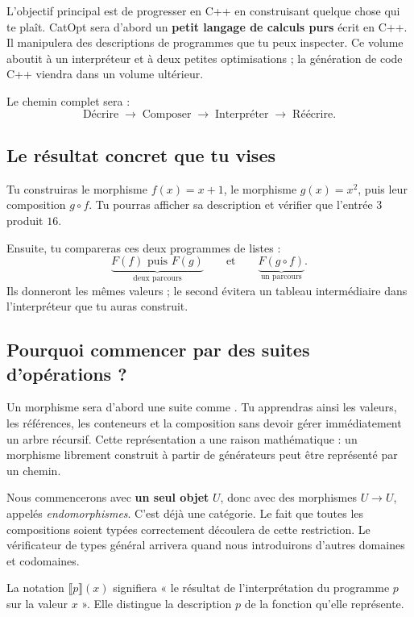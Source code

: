 \documentclass[11pt,a4paper]{article}
\newcommand{\code}[1]{\texttt{\detokenize{#1}}}
\newcommand{\sem}[1]{\llbracket #1\rrbracket}
\begin{document}
L'objectif principal est de progresser en C++ en construisant quelque chose
qui te plaît. CatOpt sera d'abord un \textbf{petit langage de calculs purs}
écrit en C++. Il manipulera des descriptions de programmes que tu peux
inspecter. Ce volume aboutit à un interpréteur et à deux petites optimisations ;
la génération de code C++ viendra dans un volume ultérieur.

Le chemin complet sera :
\[
\boxed{\text{Décrire}}\;\longrightarrow\;
\boxed{\text{Composer}}\;\longrightarrow\;
\boxed{\text{Interpréter}}\;\longrightarrow\;
\boxed{\text{Réécrire}}.
\]

\subsection{Le résultat concret que tu vises}
Tu construiras le morphisme \(f(x)=x+1\), le morphisme \(g(x)=x^2\), puis
leur composition \(g\circ f\). Tu pourras afficher sa description et
vérifier que l'entrée \(3\) produit \(16\).

Ensuite, tu compareras ces deux programmes de listes :
\[
\underbrace{F(f)\text{ puis }F(g)}_{\text{deux parcours}}
\qquad\text{et}\qquad
\underbrace{F(g\circ f)}_{\text{un parcours}}.
\]
Ils donneront les mêmes valeurs ; le second évitera un tableau intermédiaire
dans l'interpréteur que tu auras construit.

\subsection{Pourquoi commencer par des suites d'opérations ?}
Un morphisme sera d'abord une suite comme
\code{[Add(1), Square]}. Tu apprendras ainsi les valeurs, les références,
les conteneurs et la composition sans devoir gérer immédiatement un arbre
récursif. Cette représentation a une raison mathématique : un morphisme
librement construit à partir de générateurs peut être représenté par un chemin.

Nous commencerons avec \textbf{un seul objet} \(U\), donc avec des morphismes
\(U\to U\), appelés \emph{endomorphismes}. C'est déjà une catégorie.
Le fait que toutes les compositions soient typées correctement découlera
de cette restriction. Le vérificateur de types général arrivera quand nous
introduirons d'autres domaines et codomaines.

La notation \(\sem{p}(x)\) signifiera « le résultat de l'interprétation
du programme \(p\) sur la valeur \(x\) ». Elle distingue la description
\(p\) de la fonction qu'elle représente.
\end{document}
